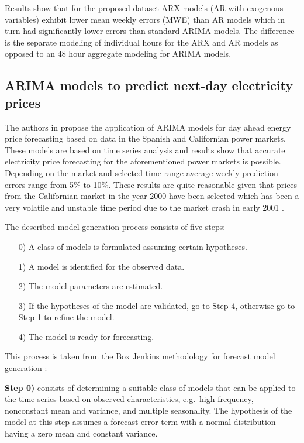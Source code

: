 Results show that for the proposed dataset ARX models (AR with exogenous variables) exhibit lower mean weekly errors (MWE) than AR models which in turn had significantly lower errors than standard ARIMA models. The difference is the separate modeling of individual hours for the ARX and AR models as opposed to an 48 hour aggregate modeling for ARIMA models. 

\subsection{ARIMA models to predict next-day electricity prices} \label{ssec:arima_models_to_predict_next_day_prices}

The authors in \cite{contreras2003arima} propose the application of ARIMA models for day ahead energy price forecasting based on data in the Spanish and Californian power markets. These models are based on time series analysis and results show that accurate electricity price forecasting for the aforementioned power markets is possible. Depending on the market and selected time range average weekly prediction errors 
range from 5\% to 10\%. These results are quite reasonable given that prices from the Californian market in the year 2000 have been selected which has been a very volatile and unstable time period due to the market crash in early 2001 \cite{weron2007modeling}. 

The described model generation process consists of five steps: 

\begin{itemize}
	\item[0)] A class of models is formulated assuming certain hypotheses.
	\item[1)] A model is identified for the observed data.
	\item[2)] The model parameters are estimated.
	\item[3)] If the hypotheses of the model are validated, go to Step 4, otherwise go to Step 1 to refine the model.
	\item[4)] The model is ready for forecasting.
\end{itemize}

This process is taken from the Box Jenkins methodology for forecast model generation \cite{hibon1997arma}:

\textbf{Step 0)} consists of determining a suitable class of models that can be applied to the time series based on observed characteristics, e.g.~high frequency, nonconstant mean and variance, and multiple seasonality. The hypothesis of the model at this step assumes a forecast error term with a normal distribution having a zero mean and constant variance. 

